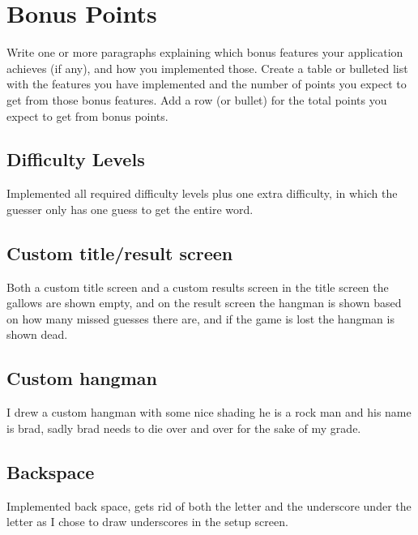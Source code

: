 \documentclass{article}
\begin{document}
\section{Bonus Points}
\begin{center}
    Write one or more paragraphs explaining which bonus features your application achieves (if any), and how you implemented those. Create a table or bulleted list with the features you have implemented and the number of points you expect to get from those bonus features. Add a row (or bullet) for the total points you expect to get from bonus points.
\end{center}
\subsection{Difficulty Levels}
\begin{center}
    Implemented all required difficulty levels plus one extra difficulty, in which the guesser only has one guess to get the entire word.
\end{center}
\subsection{Custom title/result screen}
\begin{center}
    Both a custom title screen and a custom results screen in the title screen the gallows are shown empty, and on the result screen the hangman is shown based on how many missed guesses there are, and if the game is lost the hangman is shown dead.
\end{center}
\subsection{Custom hangman}
\begin{center}
    I drew a custom hangman with some nice shading he is a rock man and his name is brad, sadly brad needs to die over and over for the sake of my grade.
\end{center}
\subsection{Backspace}
\begin{center}
    Implemented back space, gets rid of both the letter and the underscore under the letter as I chose to draw underscores in the setup screen.
\end{center}
\end{document}
